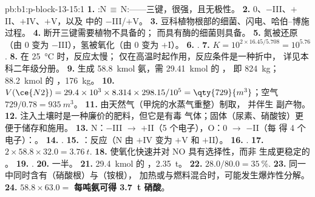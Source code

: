 \begin{solution}{pb:b1:p-block-13-15:1}
\textbf{1.} :N\,$\equiv$\,N:——三键，很强，且无极性。
\textbf{2.} 0、$-$III、$+$II、$+$IV、$+$V，以及  中的 $-$III/$+$V。
\textbf{3.} 豆科植物根部的细菌、闪电、哈伯–博施
过程。
\textbf{4.} 断开三键需要植物不具备的；
而具有酶的细菌则具备。
\textbf{5.} 氮被还原（由 0 变为 $-$III），氢被氧化（由 0 变为 $+$I）。
\textbf{6.} .
\textbf{7.} $K = 10^{2 \times 16.45/5.708} = 10^{5.76}$.
\textbf{8.} 在 \qty{25}{\celsius} 时，反应太慢；
仅在高温时起作用，反应条件是一种折中，
详见本科二年级分册。
\textbf{9.} 生成 \qty{58.8}{kmol} 氨，需 \qty{29.41}{kmol} 的 ，
即 \qty{824}{kg}；\qty{88.2}{kmol} 的 ，\qty{176}{kg}。
\textbf{10.} $V(\ce{N2}) = 29.4 \times 10^3 \times 8.314 \times 298.15/10^5 =
\qty{729}{m^3}$；空气 $729/0.78 = \qty{935}{m^3}$。
\textbf{11.} 由天然气（甲烷的水蒸气重整）制取，
并伴生  副产物。
\textbf{12.} 注入土壤时是一种廉价的肥料，但它是有毒
气体；固体（尿素、硝酸铵）更便于储存和施用。
\textbf{13.} N：$-$III $\to$ $+$II（5 个电子），O：0 $\to$ $-$II（每
 得 4 个电子）：。
\textbf{14.} .
\textbf{15.} ：反应（N 由 $+$IV 变为
$+$V 和 $+$II）。
\textbf{16.} .
\textbf{17.} $2 \times 58.8 \times 32.0 = \qty{3.76}{t}$.
\textbf{18.} 使氧化快速并对 NO 具有选择性，而非
生成更稳定的 。
\textbf{19.} .
\textbf{20.} 一半。
\textbf{21.} \qty{29.4}{kmol} 的 ，\qty{2.35}{t}。
\textbf{22.} $28.0/80.0 = \qty{35}{\percent}$.
\textbf{23.} 同一中同时含有（硝酸根）与（铵根），
加热或与燃料混合时，可能发生爆炸性分解。
\textbf{24.} $58.8 \times 63.0 =$ \textbf{每吨氨可得 \qty{3.7}{t}
硝酸}。
\end{solution}

